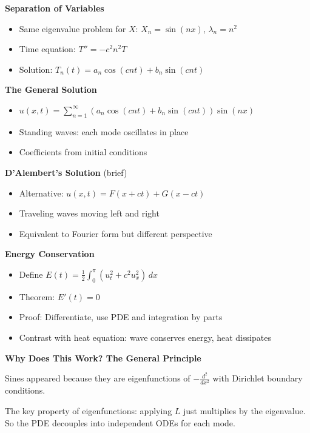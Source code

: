 \documentclass[
  10pt,
  letterpaper,
]{scrbook}
\providecommand{\tightlist}{%
  \setlength{\itemsep}{0pt}\setlength{\parskip}{0pt}}
\begin{document}
\textbf{Separation of Variables}

\begin{itemize}
\tightlist
\item
  Same eigenvalue problem for \(X\): \(X_n = \sin(nx)\),
  \(\lambda_n = n^2\)
\item
  Time equation: \(T'' = -c^2 n^2 T\)
\item
  Solution: \(T_n(t) = a_n \cos(cnt) + b_n \sin(cnt)\)
\end{itemize}

\textbf{The General Solution}

\begin{itemize}
\tightlist
\item
  \(u(x, t) = \sum_{n=1}^\infty (a_n \cos(cnt) + b_n \sin(cnt))\sin(nx)\)
\item
  Standing waves: each mode oscillates in place
\item
  Coefficients from initial conditions
\end{itemize}

\textbf{D'Alembert's Solution} (brief)

\begin{itemize}
\tightlist
\item
  Alternative: \(u(x, t) = F(x + ct) + G(x - ct)\)
\item
  Traveling waves moving left and right
\item
  Equivalent to Fourier form but different perspective
\end{itemize}

\textbf{Energy Conservation}

\begin{itemize}
\tightlist
\item
  Define \(E(t) = \frac{1}{2}\int_0^\pi (u_t^2 + c^2 u_x^2)\, dx\)
\item
  Theorem: \(E'(t) = 0\)
\item
  Proof: Differentiate, use PDE and integration by parts
\item
  Contrast with heat equation: wave conserves energy, heat dissipates
\end{itemize}

\textbf{Why Does This Work? The General Principle}

Sines appeared because they are eigenfunctions of \(-\frac{d^2}{dx^2}\)
with Dirichlet boundary conditions.

The key property of eigenfunctions: applying \(L\) just multiplies by
the eigenvalue. So the PDE decouples into independent ODEs for each
mode.
\end{document}
